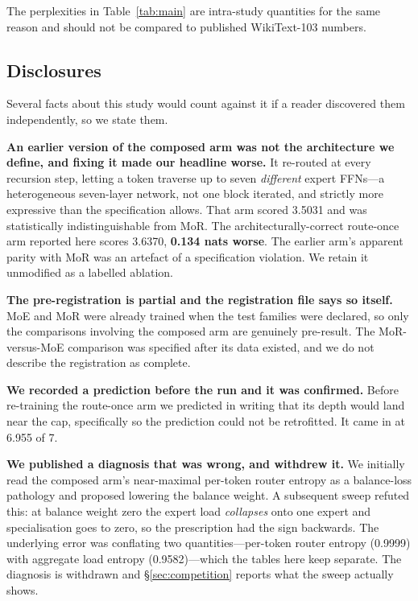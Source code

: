 The perplexities in Table~\ref{tab:main} are intra-study quantities for the same
reason and should not be compared to published WikiText-103 numbers.

\subsection*{Disclosures}
\label{sec:honesty}

Several facts about this study would count against it if a reader discovered them
independently, so we state them.

\textbf{An earlier version of the composed arm was not the architecture we define,
and fixing it made our headline worse.} It re-routed at every recursion step,
letting a token traverse up to seven \emph{different} expert FFNs---a heterogeneous
seven-layer network, not one block iterated, and strictly more expressive than the
specification allows. That arm scored 3.5031 and was statistically indistinguishable
from MoR. The architecturally-correct route-once arm reported here scores 3.6370,
\textbf{0.134 nats worse}. The earlier arm's apparent parity with MoR was an
artefact of a specification violation. We retain it unmodified as a labelled
ablation.

\textbf{The pre-registration is partial and the registration file says so itself.}
MoE and MoR were already trained when the test families were declared, so only the
comparisons involving the composed arm are genuinely pre-result. The MoR-versus-MoE
comparison was specified after its data existed, and we do not describe the
registration as complete.

\textbf{We recorded a prediction before the run and it was confirmed.} Before
re-training the route-once arm we predicted in writing that its depth would land
near the cap, specifically so the prediction could not be retrofitted. It came in
at 6.955 of 7.

\textbf{We published a diagnosis that was wrong, and withdrew it.} We initially
read the composed arm's near-maximal per-token router entropy as a balance-loss
pathology and proposed lowering the balance weight. A subsequent sweep refuted
this: at balance weight zero the expert load \emph{collapses} onto one expert and
specialisation goes to zero, so the prescription had the sign backwards. The
underlying error was conflating two quantities---per-token router entropy (0.9999)
with aggregate load entropy (0.9582)---which the tables here keep separate. The
diagnosis is withdrawn and \S\ref{sec:competition} reports what the sweep actually
shows.

